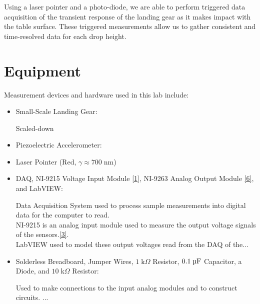 \documentclass{article}
\begin{document}
Using a laser pointer and a photo-diode, we are able to perform triggered data acquisition of the transient response of the landing gear as it makes impact with the table surface. These triggered measurements allow us to gather consistent and time-resolved data for each drop height.

\section{Equipment}
Measurement devices and hardware used in this lab include:
\begin{itemize}

\item Small-Scale Landing Gear: 
\vspace{1mm}

Scaled-down 

\vspace{2.5mm}

\item Piezoelectric Accelerometer:
\vspace{1mm}

\vspace{2.5mm}

\item Laser Pointer (Red, $\gamma \approx 700\; \text{nm}$)
\vspace{1mm}

\vspace{2.5mm}


\item DAQ, NI-9215 Voltage Input Module \hyperlink{datasheets}{[1]}, NI-9263 Analog Output Module \hyperlink{datasheets}{[6]},  and LabVIEW:
\vspace{1mm}

Data Acquisition System used to process sample measurements into digital data for the computer to read.\\[5pt]
NI-9215 is an analog input module used to measure the output voltage signals of the sensors.\hyperlink{datasheets}{[3]}.\\[5pt]
LabVIEW used to model these output voltages read from the DAQ of the...

\item Solderless Breadboard, Jumper Wires, $1\; \text{k}\Omega$ Resistor, $0.1\; \micro\text{F}$ Capacitor, a Diode, and $10\; \text{k}\Omega$ Resistor: 
\vspace{1mm}

Used to make connections to the input analog modules and to construct circuits. ...

\end{itemize}
\end{document}
